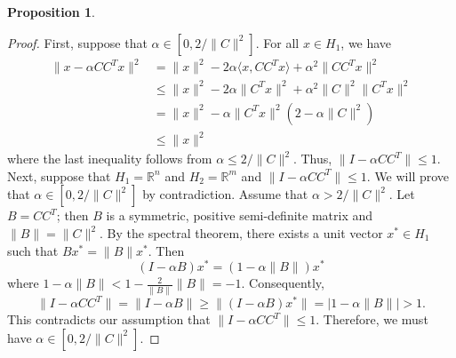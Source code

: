\documentclass[11pt]{article}
\theoremstyle{plain}
\newtheorem{proposition}[theorem]{Proposition}
\newcommand{\R}{{\mathbb R}}
\begin{document}
{{\begin{proposition}
\end{proposition}
\begin{proof}
First, suppose that $\alpha \in [0,2/\|C\|^2]$. For all $x\in H_1$, we have 
\begin{align*}
\|x-\alpha CC^T x\|^2 &= \|x\|^2 - 2\alpha \langle x, CC^T x \rangle + \alpha^2 \|CC^T x\|^2 \\
&\leq \|x\|^2 - 2\alpha \|C^T x\|^2 + \alpha^2 \|C\|^2\|C^T x\|^2 \\
&= \|x\|^2 - \alpha \|C^T x\|^2 (2 - \alpha \|C\|^2) \\
&\leq \|x\|^2
\end{align*}
where the last inequality follows from $\alpha \leq 2/\|C\|^2$. Thus, $\|I - \alpha CC^T\| \leq 1$.\\
Next, suppose that $H_1=\R^n$ and $H_2=\R^m$ and $\|I - \alpha CC^T\| \leq 1$. We will prove that $\alpha \in [0,2/\|C\|^2]$ by contradiction. Assume that $\alpha > 2/\|C\|^2$. Let $B = CC^T$; then $B$ is a symmetric, positive semi-definite matrix and $\|B\| = \|C\|^2$. By the spectral theorem, there exists a unit vector $x^* \in H_1$ such that $Bx^* = \|B\| x^*$. Then 
\[
(I - \alpha B)x^* = (1 - \alpha \|B\|)x^*
\]
where $1 - \alpha \|B\| < 1 - \frac{2}{\|B\|}\|B\| = -1$. Consequently,
\[
\|I - \alpha CC^T\| = \|I - \alpha B\| \geq \|(I - \alpha B)x^*\| = |1 - \alpha \|B\|| > 1.
\]
This contradicts our assumption that $\|I - \alpha CC^T\| \leq 1$. Therefore, we must have $\alpha \in [0,2/\|C\|^2]$.
\end{proof}
}



}
\end{document}
